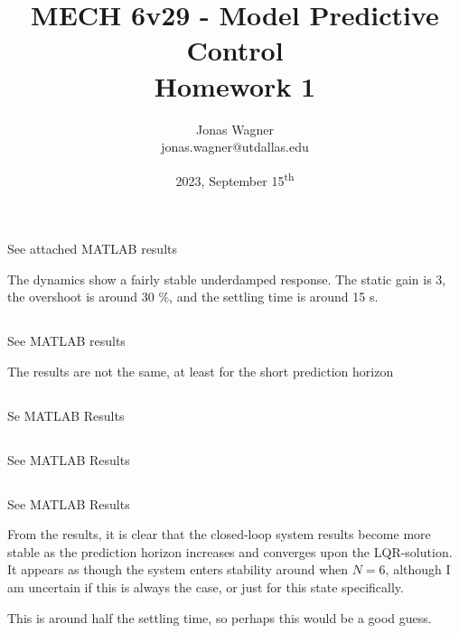 \documentclass[]{article}
\title{
    MECH 6v29 - Model Predictive Control\\ 
    Homework 1
}
\author{Jonas Wagner\\ jonas.wagner@utdallas.edu}
\date{2023, September 15\textsuperscript{th}}
\begin{document}
\maketitle

\tableofcontents

\newpage
\section{}

\subsection{}
See attached MATLAB results

The dynamics show a fairly stable underdamped response.
The static gain is 3, the overshoot is around 30 \%, and the settling time is around 15 s.


\subsection{}
See MATLAB results

The results are not the same, at least for the short prediction horizon

\subsection{}
Se MATLAB Results

\subsection{}
See MATLAB Results

\subsection{}
See MATLAB Results

From the results, it is clear that the closed-loop system results become more stable as the prediction horizon increases and converges upon the LQR-solution.
It appears as though the system enters stability around when $N=6$, although I am uncertain if this is always the case, or just for this state specifically.

This is around half the settling time, so perhaps this would be a good guess.




\section{}
\end{document}

